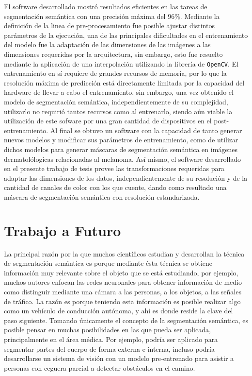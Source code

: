 El software desarrollado mostró resultados eficientes en las tareas de segmentación semántica con una precisión máxima del $96\%$. Mediante la definición de la linea de pre-procesamiento fue posible ajustar distintos parámetros de la ejecución, una de las principales dificultades en el entrenamiento del modelo fue la adaptación de las dimensiones de las imágenes a las dimensiones requeridas por la arquitectura, sin embargo, esto fue resuelto mediante la aplicación de una interpolación utilizando la librería de \texttt{OpenCV}. El entrenamiento en sí requiere de grandes recursos de memoria, por lo que la resolución máxima de predicción está directamente limitada por la capacidad del hardware de llevar a cabo el entrenamiento, sin embargo, una vez obtenido el modelo de segmentación semántica, independientemente de su complejidad, utilizarlo no requirió tantos recursos como al entrenarlo, siendo aún viable la utilización de este sofware por una gran cantidad de dispositivos en el post-entrenamiento. Al final se obtuvo un software con la capacidad de tanto generar nuevos modelos y modificar sus parámetros de entrenamiento, como de utilizar dichos modelos para generar máscaras de segmentación semántica en imágenes dermatolólogicas relacionadas al melanoma. Así mismo, el software desarrollado en el presente trabajo de tesis provee las transformaciones requeridas para adaptar las dimensiones de los datos, independientemente de su resolución y de la cantidad de canales de color con los que cuente, dando como resultado una máscara de segmentación semántica con resolución estandarizada.

\section{Trabajo a Futuro}
La principal razón por la que muchos científicos estudian y desarrollan la técnica de segmentación semántica es porque mediante ésta técnica se obtiene información muy relevante sobre el objeto que se está estudiando, por ejemplo, muchos autores enfocan las redes neuronales para obtener información de medio como distinguir mediante una cámara a las personas, a los objetos, a las señales de tráfico. La razón es porque teniendo esta información es posible realizar algo como un vehículo de conducción autónoma, y ahí es donde reside la clave del paso siguiente. Tomando únicamente el concepto de la segmentación semántica, es posible pensar en muchas posibilidades en las que pueda ser aplicada, principalmente en el área médica. Por ejemplo, podría ser aplicado para segmentar partes del cuerpo de forma externa e interna, incluso podría desarrollarse un sistema de visión con un modelo pre-entrenado para asistir a personas con ceguera parcial a detectar obstáculos en el camino.


